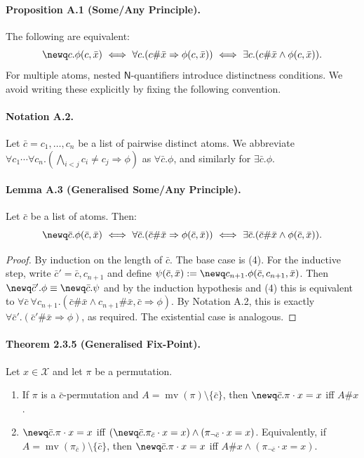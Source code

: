 \paragraph{Proposition A.1 (Some/Any Principle).} The following are equivalent:
\[
\newq c.\phi(c,\bar x)\ \Longleftrightarrow\ \forall c.(c\#\bar x\Rightarrow\phi(c,\bar x))\ \Longleftrightarrow\ \exists c.(c\#\bar x\land\phi(c,\bar x)).
\]
For multiple atoms, nested $\mathsf N$-quantifiers introduce distinctness conditions. We avoid writing these explicitly by fixing the following convention.
\paragraph{Notation A.2.} Let $\bar c=c_1,\ldots,c_n$ be a list of pairwise distinct atoms.
We abbreviate $\forall c_1\cdots\forall c_n.(\bigwedge_{i<j}c_i\ne c_j\Rightarrow\phi)$ as $\forall\bar c.\phi$, and similarly for $\exists\bar c.\phi$.
\paragraph{Lemma A.3 (Generalised Some/Any Principle).} Let $\bar c$ be a list of atoms. Then:
\[
\newq\bar c.\phi(\bar c,\bar x)\ \Longleftrightarrow\ \forall\bar c.(\bar c\#\bar x\Rightarrow\phi(\bar c,\bar x))\ \Longleftrightarrow\ \exists\bar c.(\bar c\#\bar x\land\phi(\bar c,\bar x)).
\]
\begin{proof}
By induction on the length of $\bar c$. The base case is (4).
For the inductive step, write $\bar c'=\bar c,c_{n+1}$ and define $\psi(\bar c,\bar x):=\newq c_{n+1}.\phi(\bar c,c_{n+1},\bar x)$.
Then $\newq\bar c'.\phi\equiv\newq\bar c.\psi$ and by the induction hypothesis and (4) this is equivalent to $\forall\bar c\ \forall c_{n+1}.(\bar c\#\bar x\land c_{n+1}\#\bar x,\bar c\Rightarrow\phi)$.
By Notation A.2, this is exactly $\forall\bar c'.(\bar c'\#\bar x\Rightarrow\phi)$, as required. The existential case is analogous.
\end{proof}

\paragraph{Theorem 2.3.5 (Generalised Fix-Point).} Let $x\in\mathcal X$ and let $\pi$ be a permutation.
\begin{enumerate}
\item If $\pi$ is a $\bar c$-permutation and $A=\operatorname{mv}(\pi)\setminus\{\bar c\}$, then $\newq\bar c.\pi\cdot x=x$ iff $A\#x$.
\item $\newq\bar c.\pi\cdot x=x$ iff $(\newq\bar c.\pi_{\bar c}\cdot x=x)\land(\pi_{\neg\bar c}\cdot x=x)$.
Equivalently, if $A=\operatorname{mv}(\pi_{\bar c})\setminus\{\bar c\}$, then $\newq\bar c.\pi\cdot x=x$ iff $A\#x\land(\pi_{\neg\bar c}\cdot x=x)$.
\end{enumerate}

